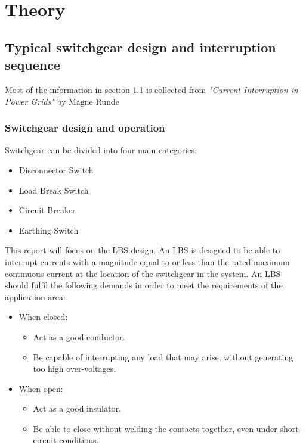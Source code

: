 \documentclass[10pt,b5paper,twoside]{article}
\begin{document}
\cleardoublepage

\section{Theory}
\subsection{Typical switchgear design and interruption sequence} \label{sec:genDes}
Most of the information in section \ref{sec:genDes} is collected from \textit{"Current Interruption in Power Grids"} by Magne Runde \cite{bib:HVEbreak} \newline

\subsubsection{Switchgear design and operation} \label{sec:InterruptCurrent}
Switchgear can be divided into four main categories:
\begin{itemize}
\item Disconnector Switch
\item Load Break Switch
\item Circuit Breaker
\item Earthing Switch
\end{itemize}

This report will focus on the LBS design. An LBS is designed to be able to interrupt currents with a magnitude equal to or less than the rated maximum continuous current at the location of the switchgear in the system. An LBS should fulfil the following demands in order to meet the requirements of the application area:

\begin{itemize}
\item When closed:
	\begin{itemize}
		\item Act as a good conductor.
		\item Be capable of interrupting any load that may arise, without generating too high over-voltages. 
	\end{itemize}
\item When open:
	\begin{itemize}
		\item Act as a good insulator.
		\item Be able to close without welding the contacts together, even under short-circuit conditions.
	\end{itemize}
\end{itemize}
\end{document}
